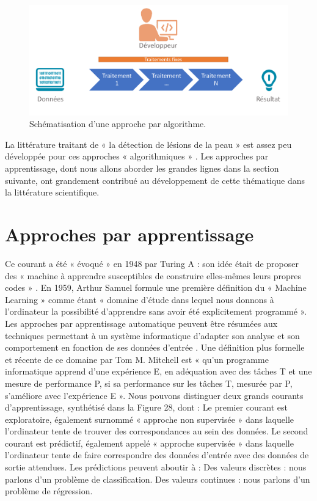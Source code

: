 \begin{figure}[H]
    \centering
    \includegraphics[width=\linewidth]{contents/chapter_3/resources/StandardProcess.pdf}
    \caption{Schématisation d’une approche par algorithme.}
    \label{fig:chapter_3:standard}
\end{figure}
La littérature traitant de « la détection de lésions de la peau » est assez peu développée pour ces approches « algorithmiques » \cite{Moss1989}. Les approches par apprentissage, dont nous allons aborder les grandes lignes dans la section suivante, ont grandement contribué au développement de cette thématique dans la littérature scientifique.\par

\section{Approches par apprentissage}
Ce courant a été « évoqué » en 1948 par Turing A : son idée était de proposer des « machine à apprendre susceptibles de construire elles-mêmes leurs propres codes » \cite{Turing1950}. En 1959, Arthur Samuel  formule une première définition du « Machine Learning » comme étant « domaine d’étude dans lequel nous donnons à l’ordinateur la possibilité d’apprendre sans avoir été explicitement programmé ». Les approches par apprentissage automatique peuvent être résumées aux techniques permettant à un système informatique d’adapter son analyse et son comportement en fonction de ses données d’entrée  . Une définition plus formelle et récente de ce domaine par Tom M. Mitchell  est « qu’un programme informatique apprend d’une expérience E, en adéquation avec des tâches T et une mesure de performance P, si sa performance sur les tâches T, mesurée par P, s’améliore avec l’expérience E ».
Nous pouvons distinguer deux grands courants d’apprentissage, synthétisé dans la Figure 28, dont : 
	Le premier courant est exploratoire, également surnommé « approche non supervisée » dans laquelle l’ordinateur tente de trouver des correspondances au sein des données.
	Le second courant est prédictif, également appelé « approche supervisée » dans laquelle l’ordinateur tente de faire correspondre des données d’entrée avec des données de sortie attendues. Les prédictions peuvent aboutir à :
	Des valeurs discrètes : nous parlons d’un problème de classification.
	Des valeurs continues : nous parlons d’un problème de régression.

